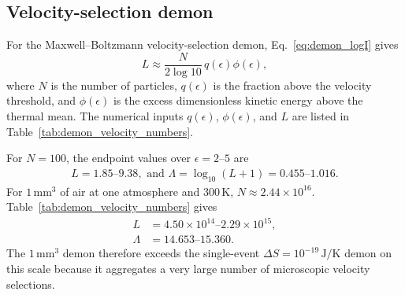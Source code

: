 \documentclass[
  aps,
  prresearch,
  reprint,
  amsmath,
  amssymb,
  superscriptaddress,
  nofootinbib,
  longbibliography
]{revtex4-2}
\def\EQSP{3pt}
\newcommand{\cgather}[2][\EQSP]{\begingroup\setlength\abovedisplayskip{#1}\setlength\belowdisplayskip{#1}\begin{gather} #2 \end{gather}\endgroup\noindent}
\begin{document}
\subsection{Velocity-selection demon}

For the Maxwell--Boltzmann velocity-selection demon, Eq.~\eqref{eq:demon_logI} gives
\begin{equation}
    L\approx
    \frac{N}{2\log 10}\,
    q(\epsilon)\phi(\epsilon),
    \label{eq:appendix_velocity_demon}
\end{equation}
where \(N\) is the number of particles, \(q(\epsilon)\) is the fraction above the velocity threshold, and \(\phi(\epsilon)\) is the excess dimensionless kinetic energy above the thermal mean. The numerical inputs \(q(\epsilon)\), \(\phi(\epsilon)\), and \(L\) are listed in Table~\ref{tab:demon_velocity_numbers}.

For \(N=100\), the endpoint values over \(\epsilon=2\)--\(5\) are
\cgather{
    L=1.85\text{--}9.38, \text{ and }
    \Lambda
      =\log_{10}(L+1)
        =0.455\text{--}1.016.}
For \(1\,\mathrm{mm}^3\) of air at one atmosphere and \(300\,\mathrm{K}\), \(N\approx2.44\times10^{16}\). Table~\ref{tab:demon_velocity_numbers} gives
\begin{align}
    L&=4.50\times10^{14}
       \text{--}2.29\times10^{15},\\
    \Lambda&=14.653\text{--}15.360.
\end{align}
The \(1\,\mathrm{mm}^3\) demon therefore exceeds the single-event \(\Delta S=10^{-19}\,\mathrm{J/K}\) demon on this scale because it aggregates a very large number of microscopic velocity selections.
\end{document}
